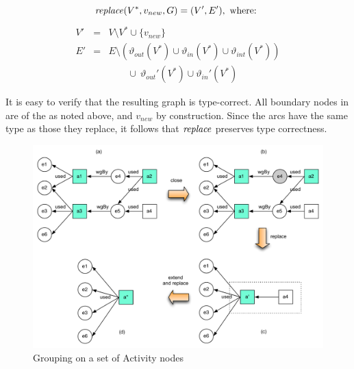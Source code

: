 \noindent
{}
\vspace*{10pt}
\begin{definition}[replace]
\label{def:group-replace}

\[ \mathit{replace} (V^*, v_{new}, G) = (V', E'), \mbox{ where: } \]
\begin{eqnarray*}
V' & = & V  \setminus V^*  \cup \{v_{new}\}\\
E' & = & E  \setminus (\vartheta_{out}(V^*) \cup \vartheta_{in}(V^*) \cup \vartheta_{int}(V^*))  \\
   & & \qquad \cup\  \vartheta_{out}'(V^*)  \cup \vartheta_{in}'(V^*)
\end{eqnarray*}
\end{definition}

It is easy to verify that the resulting graph is type-correct. All boundary nodes in   are of the  as noted above, and   $v_{new}$   by construction.
Since the arcs have the same type as those they replace, it follows that $\mathit{replace}$ preserves type correctness.



\begin{figure}
\centering
\includegraphics[scale=.5]{figures/convex-a-only.pdf} 
\caption{Grouping on a set of Activity nodes} \label{fig:convex-a-only}
\end{figure}

